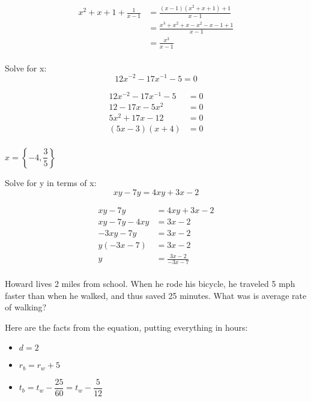 \documentclass[fleqn,addpoints]{exam}
\begin{document}
\begin{questions}
\begin{solution}[1cm]
\begin{align*}
  x^2 + x + 1 + \frac{1}{x-1} &= \frac{(x-1)(x^2+x+1) + 1}{x-1} \\
  &= \frac{x^3 + x^2 + x - x^2 - x - 1 + 1}{x-1} \\
  &= \frac{x^3}{x-1} \\
\end{align*}

\end{solution}

\question
Solve for x:
\[
  12x^{-2} - 17x^{-1} - 5 = 0
\]

\begin{solution}[1cm]
\begin{align*}
  12x^{-2} - 17x^{-1} - 5 &= 0 \\
  12 - 17x - 5x^2 &= 0 \\
  5x^2 + 17x - 12 &= 0 \\
  (5x-3)(x+4) &= 0 \\
\end{align*}

$x = \left\{ -4, \dfrac{3}{5} \right\}$

\end{solution}

\ifprintanswers
\pagebreak
\fi


\question
Solve for y in terms of x:
\[
  xy - 7y = 4xy + 3x - 2
\]

\begin{solution}[1cm]
\begin{align*}
  xy - 7y &= 4xy + 3x - 2 \\
  xy - 7y - 4xy &= 3x - 2 \\
  - 3xy - 7y  &= 3x - 2 \\
  y(-3x -7) &= 3x - 2 \\
  y &= \frac{3x - 2}{- 3x -7} \\
\end{align*}

\end{solution}

\question
Howard lives 2 miles from school.  When he rode his bicycle, he traveled 5 mph faster than when he walked, and thus saved
25 minutes.  What was is average rate of walking? 

\begin{solution}[1cm]
Here are the facts from the equation, putting everything in hours:
\begin{itemize}
  \item $d = 2$
  \item $r_b = r_w + 5$
  \item $t_b = t_w - \dfrac{25}{60} = t_w - \dfrac{5}{12}$
\end{itemize}


\end{solution}
\end{questions}
\end{document}

